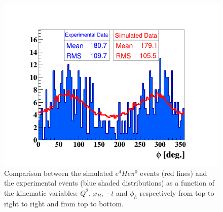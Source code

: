 \begin{figure}[h!]
\hspace{-0.4in}\includegraphics[scale=0.37]{fig_dvcs/comp/phi_h_Coh_pi0.png}
\caption{Comparison between the simulated $e^{4}He\pi^{0}$ events (red lines) and the experimental events (blue shaded distributions) as a function of the kinematic variables: $Q^{2}$, $x_{B}$, $-t$ and $\phi_{h}$ respectively from top to right to right and from top to bottom.}
\label{fig:coh_pi0_comparison_with_simulation}
\end{figure}

